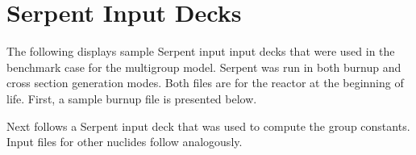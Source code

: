 \chapter{Serpent Input Decks}
\label{appendix_serpent_input}

The following displays sample Serpent input input decks that were used in the benchmark 
case for the multigroup model.  Serpent was run in both burnup and cross section generation 
modes.  Both files are for the reactor at the beginning of life.  First, a sample burnup file 
is presented below.  

\vspace{1em}



\vspace{1em}

Next follows a Serpent input deck that was used to compute the  group constants. 
Input files for other nuclides follow analogously.

\vspace{1em}



